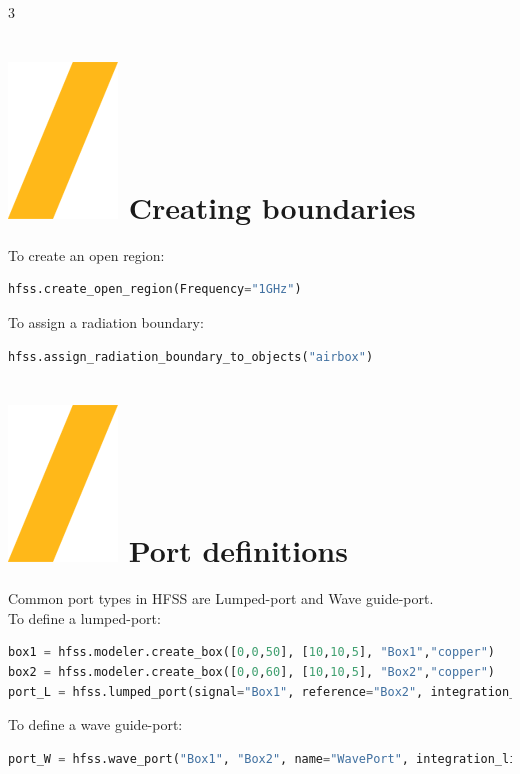 \documentclass[9pt,landscape]{article}
\begin{document}
\begin{multicols}{3}
\section{\includegraphics[height=\fontcharht\font`\S]{slash.png} Creating boundaries}
To create an open region:
\begin{lstlisting}[language=Python]
hfss.create_open_region(Frequency="1GHz")
\end{lstlisting}
To assign a radiation boundary:
\begin{lstlisting}[language=Python]
hfss.assign_radiation_boundary_to_objects("airbox")
\end{lstlisting}

\section{\includegraphics[height=\fontcharht\font`\S]{slash.png} Port definitions}
Common port types in HFSS are Lumped-port and Wave guide-port.
\newline
\\
To define a lumped-port:
\begin{lstlisting}[language=Python]
box1 = hfss.modeler.create_box([0,0,50], [10,10,5], "Box1","copper")
box2 = hfss.modeler.create_box([0,0,60], [10,10,5], "Box2","copper")
port_L = hfss.lumped_port(signal="Box1", reference="Box2", integration_line=hfss.AxisDir.XNeg, impedance=50, name="LumpedPort", renormalize=True, deembed=False)
\end{lstlisting}
To define a wave guide-port:
\begin{lstlisting}[language=Python]
port_W = hfss.wave_port("Box1", "Box2", name="WavePort", integration_line=1)
\end{lstlisting}


\end{multicols}
\end{document}

